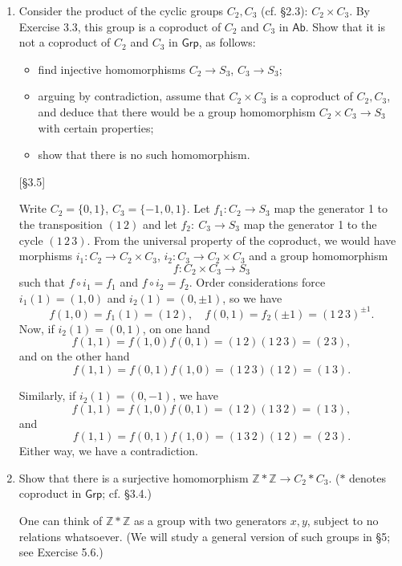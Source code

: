 \begin{enumerate}
      \item Consider the product of the cyclic groups $C_2, C_3$ (cf. \S2.3): $C_2 \times C_3$. By Exercise 3.3, this group is a coproduct of $C_2$ and $C_3$ in $\mathsf{Ab}$. Show that it is not a coproduct of $C_2$ and $C_3$ in $\mathsf{Grp}$, as follows:
            \begin{itemize}
                  \item find injective homomorphisms $C_2 \to S_3$, $C_3 \to S_3$;
                  \item arguing by contradiction, assume that $C_2 \times C_3$ is a coproduct of $C_2, C_3$, and deduce that there would be a group homomorphism $C_2 \times C_3 \to S_3$ with certain properties;
                  \item show that there is no such homomorphism.
            \end{itemize}
            [\S3.5]

            \begin{solution}
                  Write $C_2 = \{0,1\}$, $C_3 = \{-1,0,1 \}$. Let $f_1:C_2 \to S_3$ map the generator 1 to the transposition $(1 \, 2)$ and let $f_2:~C_3 \to S_3$ map the generator 1 to the cycle $(1 \, 2 \, 3)$. From the universal property of the coproduct, we would have morphisms $i_1:C_2 \to C_2 \times C_3$, $i_2:C_3 \to C_2 \times C_3$ and a group homomorphism \[ f:C_2 \times C_3 \to S_3 \] such that $f \circ i_1 = f_1$ and $f \circ i_2 = f_2$. Order considerations force $i_1(1) = (1,0)$ and $i_2(1) = (0,\pm1)$, so we have \[ f(1,0) = f_1(1) = (1 \, 2), \quad f(0,1) = f_2(\pm1) = (1 \, 2 \, 3)^{\pm 1}. \]
                  Now, if $i_2(1) = (0,1)$, on one hand \[ f(1,1) = f(1,0)f(0,1) = (1 \, 2)(1 \, 2 \, 3) = (2 \, 3), \] and on the other hand \[ f(1,1) = f(0,1)f(1,0) = (1 \, 2 \, 3)(1 \, 2) = (1 \, 3). \]

                  Similarly, if $i_2(1) = (0,-1)$, we have \[ f(1,1) = f(1,0)f(0,1) = (1 \, 2)(1 \, 3 \, 2) = (1 \, 3), \] and \[ f(1,1) = f(0,1)f(1,0) = (1 \, 3 \, 2)(1 \, 2) = (2 \, 3). \] Either way, we have a contradiction.
            \end{solution}

      \item Show that there is a surjective homomorphism $\mathbb{Z} \ast \mathbb{Z} \to C_2 \ast C_3$. ($\ast$ denotes coproduct in $\mathsf{Grp}$; cf. \S3.4.)

            One can think of $\mathbb{Z} \ast \mathbb{Z}$ as a group with two generators $x, y$, subject to no relations whatsoever. (We will study a general version of such groups in \S5; see Exercise 5.6.)


\end{enumerate}
